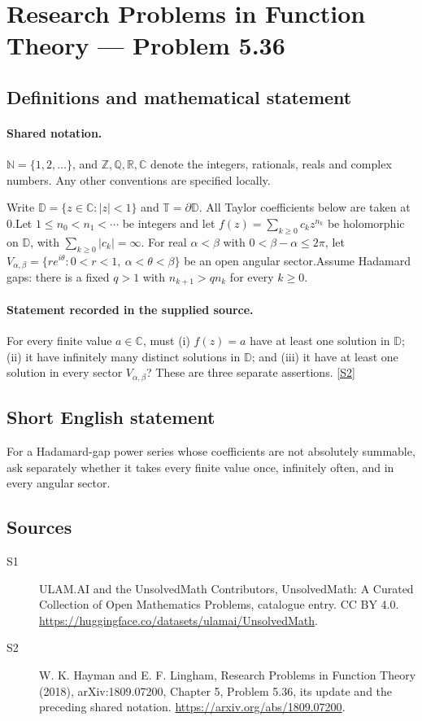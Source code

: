 \documentclass[11pt]{article}
\newcommand{\sref}[2]{\hyperlink{source:#1:#2}{[S#2]}}
\begin{document}
\section{Research Problems in Function Theory — Problem 5.36}\label{statement}

\subsection{Definitions and mathematical statement}

\paragraph{Shared notation.}$\mathbb N=\{1,2,\ldots\}$, and $\mathbb Z,\mathbb Q,\mathbb R,\mathbb C$ denote the integers, rationals, reals and complex numbers. Any other conventions are specified locally.


Write $\mathbb D=\{z\in\mathbb C:|z|<1\}$ and $\mathbb T=\partial\mathbb D$. All Taylor coefficients below are taken at $0$.Let $1\le n_0<n_1<\cdots$ be integers and let $f(z)=\sum_{k\ge0}c_kz^{n_k}$ be holomorphic on $\mathbb D$, with $\sum_{k\ge0}|c_k|=\infty$. For real $\alpha<\beta$ with $0<\beta-\alpha\le2\pi$, let $V_{\alpha,\beta}=\{re^{i\theta}:0<r<1,\ \alpha<\theta<\beta\}$ be an open angular sector.Assume Hadamard gaps: there is a fixed $q>1$ with $n_{k+1}>q n_k$ for every $k\ge0$.
\paragraph{Statement recorded in the supplied source.}
For every finite value $a\in\mathbb C$, must (i) $f(z)=a$ have at least one solution in $\mathbb D$; (ii) it have infinitely many distinct solutions in $\mathbb D$; and (iii) it have at least one solution in every sector $V_{\alpha,\beta}$? These are three separate assertions. \sref{statement}{2}
\subsection{Short English statement}
For a Hadamard-gap power series whose coefficients are not absolutely summable, ask separately whether it takes every finite value once, infinitely often, and in every angular sector.
\subsection{Sources}
\begin{description}
\item[\hypertarget{source:statement:1}{S1}] ULAM.AI and the UnsolvedMath Contributors, UnsolvedMath: A Curated Collection of Open Mathematics Problems, catalogue entry. CC BY 4.0. \url{https://huggingface.co/datasets/ulamai/UnsolvedMath}.
\item[\hypertarget{source:statement:2}{S2}] W. K. Hayman and E. F. Lingham, Research Problems in Function Theory (2018), arXiv:1809.07200, Chapter 5, Problem 5.36, its update and the preceding shared notation. \url{https://arxiv.org/abs/1809.07200}.
\end{description}
\label{end:statement}
\end{document}
